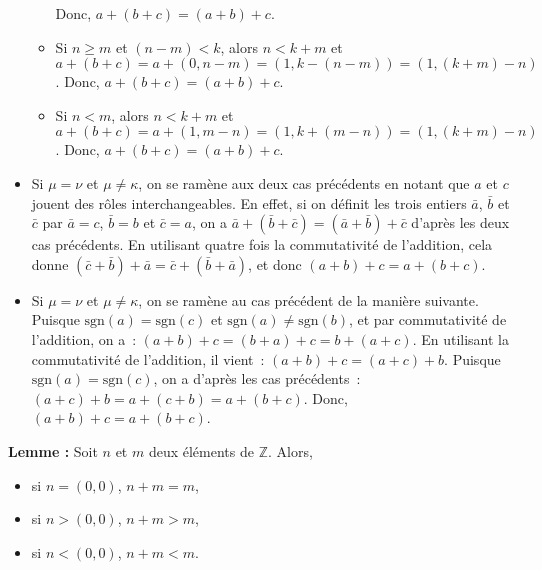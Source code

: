 \begin{itemize}[nosep]
\begin{itemize}[nosep]
                    Donc, $a+(b+c) = (a+b)+c$.
                \item Si $n \geq m$ et $(n-m) < k$, alors $n < k+m$ et $a + (b+c) = a + (0,n-m) = (1, k-(n-m)) = (1, (k+m)-n)$.
                    Donc, $a+(b+c) = (a+b)+c$.
                \item Si $n < m$, alors $n < k+m$ et $a+(b+c) = a + (1, m-n) = (1, k+(m-n)) = (1, (k+m)-n)$.
                    Donc, $a+(b+c) = (a+b)+c$.
            \end{itemize}
        \item Si $\mu = \nu$ et $\mu \neq \kappa$, on se ramène aux deux cas précédents en notant que $a$ et $c$ jouent des rôles interchangeables.
            En effet, si on définit les trois entiers $\bar{a}$, $\bar{b}$ et $\bar{c}$ par $\bar{a} = c$, $\bar{b} = b$ et $\bar{c} = a$, on a $\bar{a} + (\bar{b} + \bar{c}) = (\bar{a} + \bar{b}) + \bar{c}$ d'après les deux cas précédents.
            En utilisant quatre fois la commutativité de l'addition, cela donne $(\bar{c} + \bar{b}) + \bar{a} = \bar{c} + (\bar{b} + \bar{a})$, et donc $(a + b) + c = a + (b + c)$.
        \item Si $\mu = \nu$ et $\mu \neq \kappa$, on se ramène au cas précédent de la manière suivante.
            Puisque $\mathrm{sgn}(a) = \mathrm{sgn}(c)$ et $\mathrm{sgn}(a) \neq \mathrm{sgn}(b)$, et par commutativité de l'addition, on a : $(a+b) + c = (b+a) + c = b + (a+c)$. 
            En utilisant la commutativité de l'addition, il vient : $(a + b) + c = (a + c) + b$. 
            Puisque $\mathrm{sgn}(a) = \mathrm{sgn}(c)$, on a d'après les cas précédents : $(a + c) + b = a + (c + b) = a + (b + c)$.
            Donc, $(a + b) + c = a + (b + c)$.
    \end{itemize}

    \done

\medskip

\noindent\textbf{Lemme :} Soit $n$ et $m$ deux éléments de $\mathbb{Z}$.
    Alors, 
    \begin{itemize}[nosep]
        \item si $n = (0,0)$, $n + m = m$,
        \item si $n > (0,0)$, $n + m > m$,
        \item si $n < (0,0)$, $n + m < m$.
    \end{itemize}

\medskip

